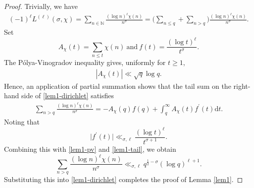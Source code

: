 \documentclass[10pt,a4paper]{amsart}
\numberwithin{equation}{section}
\newcommand{\bg}{\big}
\newcommand{\Bg}{\Big}
\newcommand{\mbn}{\mathbb{N}}
\newcommand{\mmd}{\mathrm{d}}
\begin{document}
\begin{proof}
    Trivially, we have
\begin{align}
    \label{lem1-dirichlet}
    (-1)^\ell  L^{(\ell)}(\sigma,\chi) = \sum_{n\in \mbn} \frac{(\log n )^\ell \chi(n)}{n^\sigma} = \Bg(\sum_{n \le q} +\sum_{n > q}\Bg) \frac{(\log n )^\ell \chi(n)}{n^\sigma}.
\end{align}
Set
\[
A_\chi (t) = \sum_{n \le t} \chi(n) ~\text{and}~ f(t) = \frac{(\log t)^\ell}{t^\sigma}.
\]
The P\'olya-Vinogradov inequality gives, uniformly for \(t \ge 1\), 
\begin{align}
    \label{lem1-pv}
    |A_\chi (t)| \ll \sqrt{q}\log q.
\end{align}
Hence, an application of partial summation shows that the tail sum on the right-hand side of \eqref{lem1-dirichlet} satisfies
\begin{align}
    \label{lem1-tail}
    \sum_{n > q}\frac{(\log n )^\ell \chi(n)}{n^\sigma} = -A_\chi (q) f(q) + \int_{q}^\infty A_\chi(t) f^\prime (t) \mmd t. 
\end{align}
Noting that
\[
\bg|f^\prime(t)\bg| \ll_{\sigma,\ell} \frac{(\log t)^\ell}{t^{\sigma+1}}.
\]
Combining this with \eqref{lem1-pv} and \eqref{lem1-tail}, we obtain
\[
\sum_{n > q}\frac{(\log n )^\ell \chi(n)}{n^\sigma} \ll_{\sigma,\ell} q^{\frac{1}{2}-\sigma}(\log q)^{\ell+1}.
\]
Substituting this into \eqref{lem1-dirichlet} completes the proof of Lemma \ref{lem1}.
\end{proof}
\end{document}
